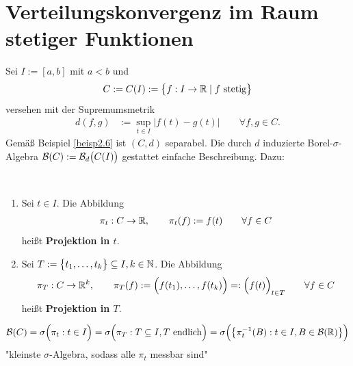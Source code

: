 
\section{Verteilungskonvergenz im Raum stetiger Funktionen} %
Sei $I:=[a,b]$ mit $a<b$ und
\begin{align*}
	C:=C(I):=\big\lbrace f:I\to\mathbb{R}\mid f\text{ stetig}\big\rbrace
\end{align*}
versehen mit der Supremumsmetrik
\begin{align*}
	d(f,g)&:=\sup\limits_{t\in I}\big|f(t)-g(t)\big|\qquad\forall f,g\in C.
\end{align*}
Gemäß Beispiel \ref{beisp2.6} ist $(C,d)$ separabel. 
Die durch $d$ induzierte Borel-$\sigma$-Algebra
$\mathcal{B}(C):=\mathcal{B}_d\big(C(I)\big)$
gestattet einfache Beschreibung. 
Dazu:

\begin{definition}\ %
	\begin{enumerate}[label=(\arabic*)]
		\item Sei $t\in I$. Die Abbildung 
		\begin{align*}
			\pi_t:C\to\mathbb{R},\qquad\pi_t(f):=f(t)\qquad\forall f\in C
		\end{align*}
		heißt \textbf{Projektion in $t$}.
		\item Sei $T:=\big\lbrace t_1,\ldots,t_k\big\rbrace\subseteq I,k\in\mathbb{N}$. Die Abbildung
		\begin{align*}
			\pi_T:C\to\mathbb{R}^k,\qquad \pi_T(f):=\Big(f(t_1),\ldots,f(t_k)\Big)=:
			\Big(f(t)\Big)_{t\in T}\qquad\forall f\in C
		\end{align*}
		heißt \textbf{Projektion in $T$}.
	\end{enumerate}
\end{definition}

\begin{satz}\label{satz7.2}
	\begin{align*}
		\mathcal{B}(C)
		=\sigma\Big(\pi_t:t\in I\Big)=\sigma\Big(\pi_T:T\subseteq I,T\text{ endlich}\Big)
		=\sigma\Big(\big\lbrace \pi_t^{-1}(B):t\in I,B\in\mathcal{B}(\mathbb{R})\big\rbrace\Big)
	\end{align*}
	"kleinste $\sigma$-Algebra, sodass alle $\pi_t$ messbar sind"
\end{satz}

